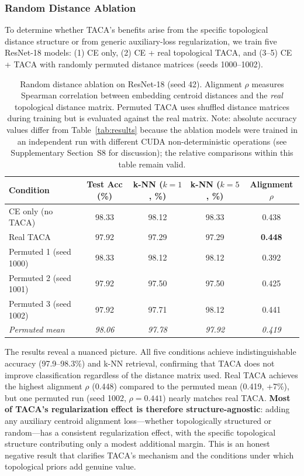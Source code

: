 \documentclass[preprint,review,12pt]{elsarticle}
\begin{document}
\subsubsection{Random Distance Ablation}
\label{sec:random_ablation}

To determine whether TACA's benefits arise from the specific topological distance structure or from generic auxiliary-loss regularization, we train five ResNet-18 models: (1) CE only, (2) CE + real topological TACA, and (3--5) CE + TACA with randomly permuted distance matrices (seeds 1000--1002).

\begin{table}[t]
\centering
\caption{Random distance ablation on ResNet-18 (seed 42). Alignment $\rho$ measures Spearman correlation between embedding centroid distances and the \emph{real} topological distance matrix. Permuted TACA uses shuffled distance matrices during training but is evaluated against the real matrix. Note: absolute accuracy values differ from Table~\ref{tab:results} because the ablation models were trained in an independent run with different CUDA non-deterministic operations (see Supplementary Section~S8 for discussion); the relative comparisons within this table remain valid.}
\label{tab:ablation}
\small
\begin{tabular}{@{}lcccc@{}}
\toprule
Condition & Test Acc (\%) & k-NN ($k{=}1$, \%) & k-NN ($k{=}5$, \%) & Alignment $\rho$ \\
\midrule
CE only (no TACA) & 98.33 & 98.12 & 98.33 & 0.438 \\
Real TACA & 97.92 & 97.29 & 97.29 & \textbf{0.448} \\
\midrule
Permuted 1 (seed 1000) & 98.33 & 98.12 & 98.12 & 0.392 \\
Permuted 2 (seed 1001) & 97.92 & 97.50 & 97.50 & 0.425 \\
Permuted 3 (seed 1002) & 97.92 & 97.71 & 98.12 & 0.441 \\
\addlinespace[2pt]
\textit{Permuted mean} & \textit{98.06} & \textit{97.78} & \textit{97.92} & \textit{0.419} \\
\bottomrule
\end{tabular}
\end{table}

The results reveal a nuanced picture. All five conditions achieve indistinguishable accuracy (97.9--98.3\%) and k-NN retrieval, confirming that TACA does not improve classification regardless of the distance matrix used. Real TACA achieves the highest alignment $\rho$ (0.448) compared to the permuted mean (0.419, +7\%), but one permuted run (seed 1002, $\rho = 0.441$) nearly matches real TACA. \textbf{Most of TACA's regularization effect is therefore structure-agnostic}: adding any auxiliary centroid alignment loss---whether topologically structured or random---has a consistent regularization effect, with the specific topological structure contributing only a modest additional margin. This is an honest negative result that clarifies TACA's mechanism and the conditions under which topological priors add genuine value.
\end{document}
